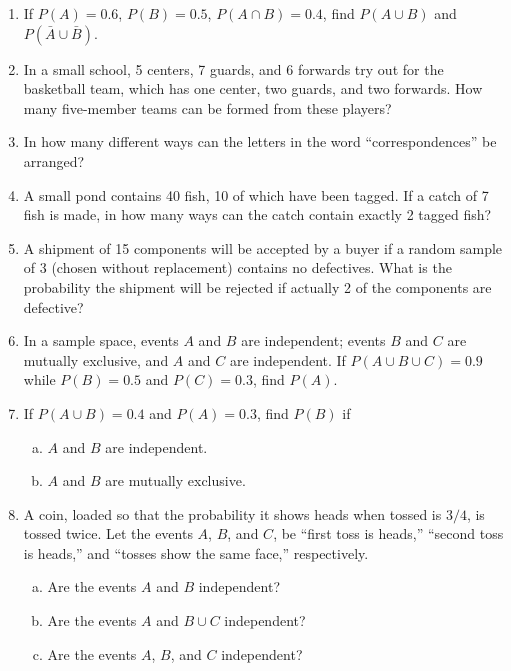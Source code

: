 \documentclass[12pt]{article}
\begin{document}
\begin{enumerate}
  \item If $P(A) = 0.6$, $P(B) = 0.5$, $P(A \cap B) = 0.4$, find $P(A \cup B)$ and $P(\bar{A} \cup \bar{B})$.

\newpage

  \item In a small school, 5 centers, 7 guards, and 6 forwards try out for the basketball team, which has one center, two guards, and two forwards. How many five-member teams can be formed from these players?

  \item In how many different ways can the letters in the word ``correspondences'' be arranged?

\newpage

  \item A small pond contains 40 fish, 10 of which have been tagged. If a catch of 7 fish is made, in how many ways can the catch contain exactly 2 tagged fish?

  \item A shipment of 15 components will be accepted by a buyer if a random sample of 3 (chosen without replacement) contains no defectives. What is the probability the shipment will be rejected if actually 2 of the components are defective?

\newpage

  \item In a sample space, events $A$ and $B$ are independent; events $B$ and $C$ are mutually exclusive, and $A$ and $C$ are independent. If $P(A \cup B \cup C) = 0.9$ while $P(B) = 0.5$ and $P(C) = 0.3$, find $P(A)$.

  \item If $P(A \cup B) = 0.4$ and $P(A) = 0.3$, find $P(B)$ if
    \begin{enumerate}[(a)]
      \item $A$ and $B$ are independent.
      \item $A$ and $B$ are mutually exclusive.
    \end{enumerate}

\newpage

  \item A coin, loaded so that the probability it shows heads when tossed is $3/4$, is tossed twice. Let the events $A$, $B$, and $C$, be ``first toss is heads,'' ``second toss is heads,'' and ``tosses show the same face,'' respectively.
    \begin{enumerate}[(a)]
      \item Are the events $A$ and $B$ independent?
      \item Are the events $A$ and $B \cup C$ independent?
      \item Are the events $A$, $B$, and $C$ independent?
    \end{enumerate}


\end{enumerate}
\end{document}

